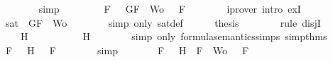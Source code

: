 \begin{isabellebody}
\ \ \ \ \ \ \isamarkupfalse%
\ simp\isanewline
\ \ \ \ \isamarkupfalse%
\ \isamarkupfalse%
\ {\isachardoublequoteopen}{\isasymexists}{\isasymA}{\isachardot}\ {\isasymforall}F\ {\isasymin}\ {\isacharparenleft}{\isacharbraceleft}\isactrlbold {\isasymnot}\ G{\isacharcomma}F{\isacharbraceright}\ {\isasymunion}\ Wo{\isacharparenright}{\isachardot}\ {\isasymA}\ {\isasymTurnstile}\ F{\isachardoublequoteclose}\isanewline
\ \ \ \ \ \ \isamarkupfalse%
\ {\isacharparenleft}iprover\ intro{\isacharcolon}\ exI{\isacharparenright}\isanewline
\ \ \ \ \isamarkupfalse%
\ \isamarkupfalse%
\ {\isachardoublequoteopen}sat\ {\isacharparenleft}{\isacharbraceleft}\isactrlbold {\isasymnot}\ G{\isacharcomma}F{\isacharbraceright}\ {\isasymunion}\ Wo{\isacharparenright}{\isachardoublequoteclose}\isanewline
\ \ \ \ \ \ \isamarkupfalse%
\ {\isacharparenleft}simp\ only{\isacharcolon}\ sat{\isacharunderscore}def{\isacharparenright}\isanewline
\ \ \ \ \isamarkupfalse%
\ {\isacharquery}thesis\isanewline
\ \ \ \ \ \ \isamarkupfalse%
\ {\isacharparenleft}rule\ disjI{}{\isacharparenright}\isanewline
\ \ \isamarkupfalse%
\isanewline
\ \ \ \ \isamarkupfalse%
\ {\isachardoublequoteopen}{\isasymnot}\ {\isacharparenleft}{\isasymA}\ {\isasymTurnstile}\ H{\isacharparenright}{\isachardoublequoteclose}\isanewline
\ \ \ \ \isamarkupfalse%
\ \isamarkupfalse%
\ {\isachardoublequoteopen}{\isasymA}\ {\isasymTurnstile}\ \isactrlbold {\isasymnot}\ H{\isachardoublequoteclose}\isanewline
\ \ \ \ \ \ \isamarkupfalse%
\ {\isacharparenleft}simp\ only{\isacharcolon}\ formula{\isacharunderscore}semantics{\isachardot}simps{\isacharparenleft}{}{\isacharparenright}\ simp{\isacharunderscore}thms{\isacharparenleft}{}{\isacharparenright}{\isacharparenright}\isanewline
\ \ \ \ \isamarkupfalse%
\ \isamarkupfalse%
\ {\isachardoublequoteopen}{\isasymforall}F\ {\isasymin}\ {\isacharbraceleft}\isactrlbold {\isasymnot}\ H{\isacharbraceright}{\isachardot}\ {\isasymA}\ {\isasymTurnstile}\ F{\isachardoublequoteclose}\isanewline
\ \ \ \ \ \ \isamarkupfalse%
\ simp\isanewline
\ \ \ \ \isamarkupfalse%
\ \isamarkupfalse%
\ {\isachardoublequoteopen}{\isasymforall}F\ {\isasymin}\ {\isacharparenleft}{\isacharbraceleft}\isactrlbold {\isasymnot}\ H{\isacharbraceright}\ {\isasymunion}\ {\isacharparenleft}{\isacharbraceleft}F{\isacharbraceright}\ {\isasymunion}\ Wo{\isacharparenright}{\isacharparenright}{\isachardot}\ {\isasymA}\ {\isasymTurnstile}\ F{\isachardoublequoteclose}\isanewline

\end{isabellebody}
